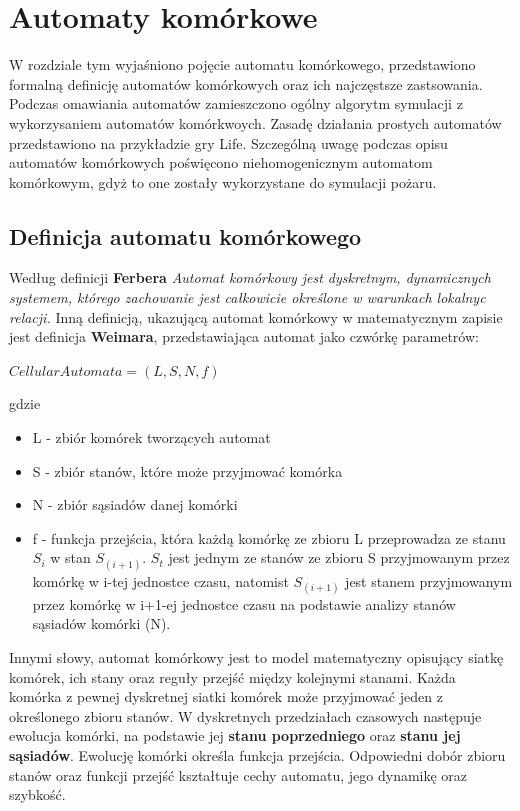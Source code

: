 ﻿%
\chapter{Automaty komórkowe}
\label{cha:Automaty komórkowe}
W rozdziale tym wyjaśniono pojęcie automatu komórkowego, przedstawiono formalną definicję automatów komórkowych oraz ich najczęstsze  zastsowania. Podczas omawiania automatów zamieszczono ogólny algorytm symulacji z wykorzysaniem automatów komórkwoych. Zasadę działania prostych automatów przedstawiono
na przykładzie gry Life. Szczególną uwagę podczas opisu 
 automatów komórkowych poświęcono niehomogenicznym automatom komórkowym, gdyż to one zostały wykorzystane
do symulacji pożaru. 
\section {Definicja automatu komórkowego}
Według definicji \textbf {Ferbera} \textsl{ Automat komórkowy jest dyskretnym, dynamicznych systemem, którego zachowanie jest
całkowicie określone w warunkach lokalnyc relacji.}
Inną definicją, ukazującą automat komórkowy w matematycznym zapisie jest definicja \textbf{Weimara}, przedstawiająca
automat jako czwórkę parametrów:
\begin{Center}
$CellularAutomata=(L,S,N,f)$
\end{Center}
gdzie
\begin{itemize}
\item L - zbiór komórek tworzących automat
\item S - zbiór stanów, które może przyjmować komórka
\item N - zbiór sąsiadów danej komórki
\item f - funkcja przejścia, która każdą komórkę ze zbioru L przeprowadza  ze stanu $S_i$ w stan $S_(i+1)$. $S_t$ jest jednym ze stanów
		ze zbioru S przyjmowanym przez komórkę w i-tej jednostce czasu, natomist $S_(i+1)$ jest stanem przyjmowanym
		przez komórkę w i+1-ej jednostce czasu na podstawie analizy stanów sąsiadów komórki (N).
\end{itemize}
Innymi słowy, automat komórkowy jest to model matematyczny opisujący siatkę komórek, ich stany oraz reguły przejść
między kolejnymi stanami. Każda komórka z pewnej dyskretnej siatki komórek może przyjmować jeden z określonego zbioru stanów.
W dyskretnych przedziałach czasowych następuje ewolucja komórki, na podstawie jej \textbf{stanu poprzedniego} oraz \textbf{stanu jej sąsiadów}. Ewolucję komórki określa funkcja przejścia. Odpowiedni dobór zbioru stanów oraz funkcji przejść kształtuje cechy automatu, jego dynamikę oraz szybkość.
